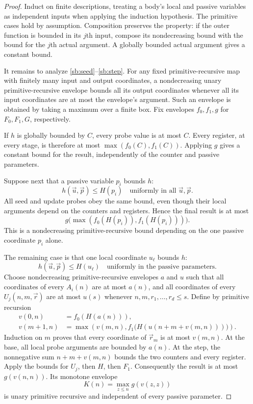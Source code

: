 \documentclass[11pt,letterpaper]{article}
\theoremstyle{definition}\newtheorem{definition}[theorem]{Definition}
\theoremstyle{remark}\newtheorem{remark}[theorem]{Remark}
\begin{document}
\begin{proof}
Induct on finite descriptions, treating a body's local and passive
variables as independent inputs when applying the induction hypothesis.
The primitive cases hold by assumption.  Composition preserves the
property: if the outer function is bounded in its $j$th input, compose
its nondecreasing bound with the bound for the $j$th actual argument.
A globally bounded actual argument gives a constant bound.

It remains to analyze \eqref{sb:seed}--\eqref{sb:step}.  For any fixed
primitive-recursive map with finitely many input and output coordinates,
a nondecreasing unary primitive-recursive envelope bounds all its output
coordinates whenever all its input coordinates are at most the envelope's
argument.  Such an envelope is obtained by taking a maximum over a finite
box.  Fix envelopes $f_0,f_1,g$ for $F_0,F_1,G$, respectively.

If $h$ is globally bounded by $C$, every probe value is at most $C$.
Every register, at every stage, is therefore at most
$\max(f_0(C),f_1(C))$.  Applying $g$ gives a constant bound for the
result, independently of the counter and passive parameters.

Suppose next that a passive variable $p_i$ bounds $h$:
\[
       h(\vec u,\vec p)\le H(p_i)
       \quad\text{uniformly in all }\vec u,\vec p.
\]
All seed and update probes obey the same bound, even though their local
arguments depend on the counters and registers.  Hence the final result
is at most
\[
       g\bigl(\max(f_0(H(p_i)),f_1(H(p_i)))\bigr).
\]
This is a nondecreasing primitive-recursive bound depending on the one
passive coordinate $p_i$ alone.

The remaining case is that one local coordinate $u_\ell$ bounds $h$:
\[
       h(\vec u,\vec p)\le H(u_\ell)
       \quad\text{uniformly in the passive parameters.}
\]
Choose nondecreasing primitive-recursive envelopes $a$ and $u$ such that
all coordinates of every $A_i(n)$ are at most $a(n)$, and all coordinates
of every $U_j(n,m,\vec r)$ are at most $u(s)$ whenever
$n,m,r_1,\ldots,r_d\le s$.  Define by primitive recursion
\[
 \begin{aligned}
 v(0,n)&=f_0(H(a(n))),\\
 v(m+1,n)&=\max\left(v(m,n),
       f_1\bigl(H(u(n+m+v(m,n)))\bigr)\right).
 \end{aligned}
\]
Induction on $m$ proves that every coordinate of $\vec r_m$ is at most
$v(m,n)$.  At the base, all local probe arguments are bounded by $a(n)$.
At the step, the nonnegative sum $n+m+v(m,n)$ bounds the two counters and
every register.  Apply the bounds for $U_j$, then $H$, then $F_1$.
Consequently the result is at most $g(v(n,n))$.  Its monotone envelope
\[
                 K(n)=\max_{z\le n}g(v(z,z))
\]
is unary primitive recursive and independent of every passive parameter.


\end{proof}
\end{document}
